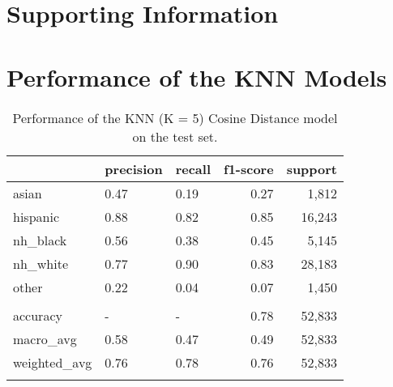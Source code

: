 \documentclass[12pt, letterpaper]{article}
\begin{document}
\section{Supporting Information}\label{si}

\section{Performance of the KNN Models}\label{knn_perf}

\begin{table}[h!]
\centering
\caption{Performance of the KNN (K = 5) Cosine Distance model on the test set.}
\begin{tabular}{lllrr}
\hline
              & precision   & recall   &   f1-score &   support \\
\hline
 asian        & 0.47        & 0.19     &       0.27 &      1,812 \\
 hispanic     & 0.88        & 0.82     &       0.85 &     16,243 \\
 nh\_black     & 0.56        & 0.38     &       0.45 &      5,145 \\
 nh\_white     & 0.77        & 0.90     &       0.83 &     28,183 \\
 other        & 0.22        & 0.04     &       0.07 &      1,450 \\
              &             &          &            &           \\
 accuracy     & -           & -        &       0.78 &     52,833 \\
 macro\_avg    & 0.58        & 0.47     &       0.49 &     52,833 \\
 weighted\_avg & 0.76        & 0.78     &       0.76 &     52,833 \\
\hline
\label{table:knn_last_name}
\end{tabular}
\end{table}
\end{document}
